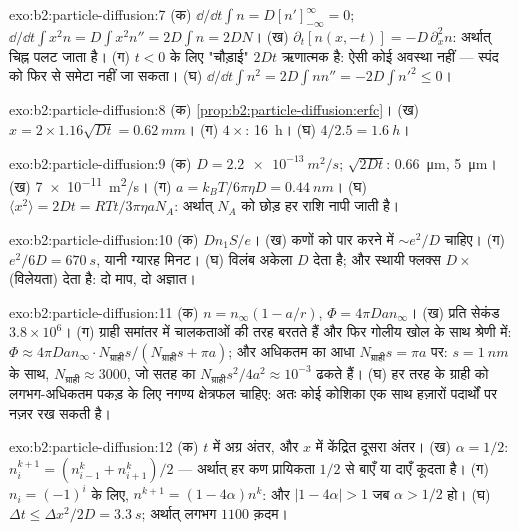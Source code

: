 \begin{solution}{exo:b2:particle-diffusion:7}
(क) $\dd/\dd t\int n = D[n']_{-\infty}^{\infty} = 0$; $\dd/\dd t\int x^2 n = D\int
x^2 n'' = 2D\int n = 2DN$। (ख) $\partial_t[n(x,-t)] = -D\,\partial_x^2 n$: अर्थात्
चिह्न पलट जाता है। (ग) $t < 0$ के लिए "चौड़ाई" $2Dt$ ऋणात्मक है: ऐसी कोई
अवस्था नहीं --- स्पंद को फिर से समेटा नहीं जा सकता। (घ) $\dd/\dd t\int n^2 = 2D\int nn''
= -2D\int n'^2 \le 0$।
\end{solution}

\begin{solution}{exo:b2:particle-diffusion:8}
(क) \cref{prop:b2:particle-diffusion:erfc}। (ख) $x = 2 \times 1.16\sqrt{Dt}
= \qty{0.62}{mm}$। (ग) $4\times$: \qty{16}{h}। (घ) $4/2.5 = \qty{1.6}{h}$।
\end{solution}

\begin{solution}{exo:b2:particle-diffusion:9}
(क) $D = \qty{2.2e-13}{m^2/s}$; $\sqrt{2Dt}$: \qty{0.66}{\micro m},
\qty{5}{\micro m}। (ख) \qty{7e-11}{m^2/s}। (ग) $a = k_BT/6\pi\eta D =
\qty{0.44}{nm}$। (घ) $\langle x^2\rangle = 2Dt = RTt/3\pi\eta a N_A$: अर्थात् $N_A$ को
छोड़ हर राशि नापी जाती है।
\end{solution}

\begin{solution}{exo:b2:particle-diffusion:10}
(क) $Dn_1S/e$। (ख) कणों को पार करने में $\sim e^2/D$ चाहिए। (ग)
$e^2/6D = \qty{670}{s}$, यानी ग्यारह मिनट। (घ) विलंब अकेला $D$ देता है;
और स्थायी फ्लक्स $D \times$ (विलेयता) देता है: दो माप,
दो अज्ञात।
\end{solution}

\begin{solution}{exo:b2:particle-diffusion:11}
(क) $n = n_\infty(1 - a/r)$, $\Phi = 4\pi D a n_\infty$। (ख) प्रति सेकंड $3.8 \times
10^6$। (ग) ग्राही समांतर में चालकताओं की तरह बरतते हैं और
फिर गोलीय खोल के साथ श्रेणी में: $\Phi \approx 4\pi Dan_\infty
\cdot N_{\text{ग्राही}}s/(N_{\text{ग्राही}}s + \pi a)$; और अधिकतम का आधा
$N_{\text{ग्राही}}s = \pi a$ पर: $s = \qty{1}{nm}$ के साथ, $N_{\text{ग्राही}} \approx
3000$, जो सतह का $N_{\text{ग्राही}}s^2/4a^2 \approx 10^{-3}$ ढकते हैं।
(घ) हर तरह के ग्राही को लगभग-अधिकतम पकड़ के लिए नगण्य क्षेत्रफल
चाहिए: अतः कोई कोशिका एक साथ हज़ारों पदार्थों पर नज़र रख सकती है।
\end{solution}

\begin{solution}{exo:b2:particle-diffusion:12}
(क) $t$ में अग्र अंतर, और $x$ में केंद्रित दूसरा अंतर। (ख)
$\alpha = 1/2$: $n_i^{k+1} = (n_{i-1}^k + n_{i+1}^k)/2$ --- अर्थात् हर कण प्रायिकता $1/2$ से
बाएँ या दाएँ कूदता है। (ग) $n_i = (-1)^i$ के लिए, $n^{k+1} =
(1 - 4\alpha)n^k$: और $|1 - 4\alpha| > 1$ जब $\alpha > 1/2$ हो। (घ) $\Delta t \le
\Delta x^2/2D = \qty{3.3}{s}$; अर्थात् लगभग $1100$ क़दम।
\end{solution}

